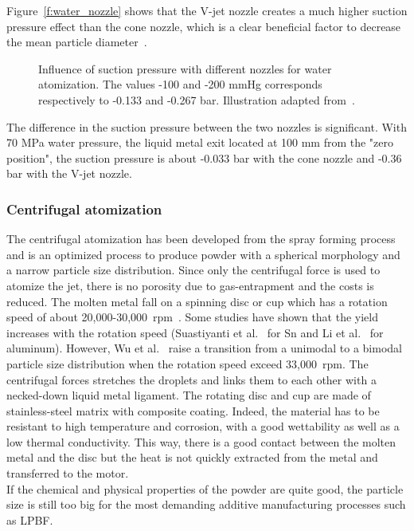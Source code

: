 \documentclass[../main]{subfiles}
\begin{document}
Figure~\ref{f:water_nozzle} shows that the V-jet nozzle creates a much higher suction pressure effect than the cone nozzle, which is a clear beneficial factor to decrease the mean particle diameter~\cite{Seki1990EffectAtomization}.

\vspace{0mm}
\begin{figure}[H]
    \centering
        
        \caption[Influence of suction pressure with different nozzles for water atomization.]{Influence of suction pressure with different nozzles for water atomization. The values -100 and -200 mmHg corresponds respectively to -0.133 and -0.267 bar. Illustration adapted from~\cite{Seki1990EffectAtomization}.}
        \label{f:depressure}
\end{figure}
\FloatBarrier
\vspace{0mm}

The difference in the suction pressure between the two nozzles is significant. With 70 MPa water pressure, the liquid metal exit located at 100 mm from the "zero position", the suction pressure is about -0.033 bar with the cone nozzle and -0.36 bar with the V-jet nozzle.\\



\subsubsection{Centrifugal atomization}

The centrifugal atomization has been developed from the spray forming process and is an optimized process to produce powder with a spherical morphology and a narrow particle size distribution. Since only the centrifugal force is used to atomize the jet, there is no porosity due to gas-entrapment and the costs is reduced. The molten metal fall on a spinning disc or cup which has a rotation speed of about 20,000-30,000~rpm~\cite{Wu2025ReviewMetal, Zhang2017ParticleSize, Suastiyanti2021DesigningCentrifugal}. Some studies have shown that the yield increases with the rotation speed (Suastiyanti et al.~\cite{Suastiyanti2021DesigningCentrifugal} for Sn and Li et al.~\cite{Zhao2023EffectsProcess} for aluminum). However, Wu et al.~\cite{Wu2025ReviewMetal} raise a transition from a unimodal to a bimodal particle size distribution when the rotation speed exceed 33,000~rpm. The centrifugal forces stretches the droplets and links them to each other with a necked-down liquid metal ligament. The rotating disc and cup are made of stainless-steel matrix with composite coating. Indeed, the material has to be resistant to high temperature and corrosion, with a good wettability as well as a low thermal conductivity. This way, there is a good contact between the molten metal and the disc but the heat is not quickly extracted from the metal and transferred to the motor.\\
If the chemical and physical properties of the powder are quite good, the particle size is still too big for the most demanding additive manufacturing processes such as LPBF.
\end{document}

